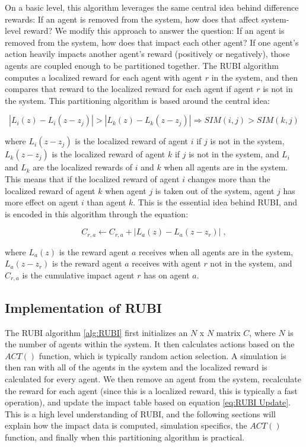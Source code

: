 \documentclass[onehalf,11pt]{beavtex}
\begin{document}
On a basic level, this algorithm leverages the same central idea behind difference rewards: If an agent is removed from the system, how does that affect system-level reward? We modify this approach to answer the question: If an agent is removed from the system, how does that impact each other agent? If one agent's action heavily impacts another agent's reward (positively or negatively), those agents are coupled enough to be partitioned together. The RUBI algorithm computes a localized reward for each agent with agent $r$ in the system, and then compares that reward to the localized reward for each agent if agent $r$ is not in the system. This partitioning algorithm is based around the central idea:

\begin{equation}
|L_i(z) - L_i(z-z_j)| > |L_k(z) - L_k(z-z_j)| \Rightarrow SIM(i,j) > SIM(k,j)
\end{equation}

where $L_i(z-z_j)$ is the localized reward of agent $i$ if $j$ is not in the system, $L_k(z-z_j)$ is the localized reward of agent $k$ if $j$ is not in the system, and $L_i$ and $L_k$ are the localized rewards of $i$ and $k$ when all agents are in the system. This means that if the localized reward of agent $i$ changes more than the localized reward of agent $k$ when agent $j$ is taken out of the system, agent $j$ has more effect on agent $i$ than agent $k$. This is the essential idea behind RUBI, and is encoded in this algorithm through the equation:

\begin{equation} \label{eq:RUBI Update}
C_{r,a} \leftarrow C_{r,a} + |L_a(z) - L_a(z-z_r) | \;,
\end{equation}

where $L_a(z)$ is the reward agent $a$ receives when all agents are in the system, $L_a(z-z_r)$ is the reward agent $a$ receives with agent $r$ not in the system, and $C_{r,a}$ is the cumulative impact agent $r$ has on agent $a$.

\subsection{Implementation of RUBI}

The RUBI algorithm \ref{alg:RUBI} first initializes an $N$ x $N$ matrix $C$, where $N$ is the number of agents within the system. It then calculates actions based on the $ACT()$ function, which is typically random action selection. A simulation is then ran with all of the agents in the system and the localized reward is calculated for every agent. We then remove an agent from the system, recalculate the reward for each agent (since this is a localized reward, this is typically a fast operation), and update the impact table based on equation \ref{eq:RUBI Update}. This is a high level understanding of RUBI, and the following sections will explain how the impact data is computed, simulation specifics, the $ACT()$ function, and finally when this partitioning algorithm is practical.
\end{document}
